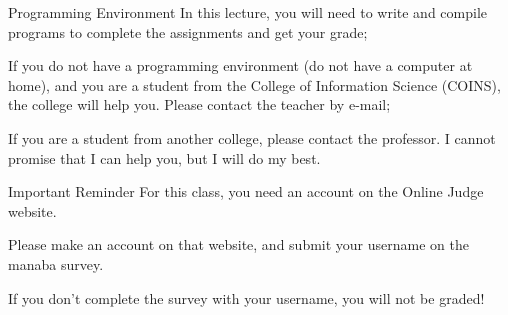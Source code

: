 \begin{frame}{Programming Environment}
  In this lecture, you will need to write and compile programs to complete
  the assignments and get your grade;
  \bigskip

  If you do not have a programming environment (do not have a computer at home),
  and you are a student from the College of Information Science (COINS), the
  college will help you. Please contact the teacher by e-mail;
  \bigskip

  If you are a student from another college, please contact the professor.
  I cannot promise that I can help you, but I will do my best.
\end{frame}

\begin{frame}{Important Reminder}
  For this class, you need an account on the Online Judge website.
  \bigskip

  Please make an account on that website, and submit your username
  on the manaba survey.
  \bigskip

  If you don't complete the survey with your username, you will
  not be graded!
\end{frame}
